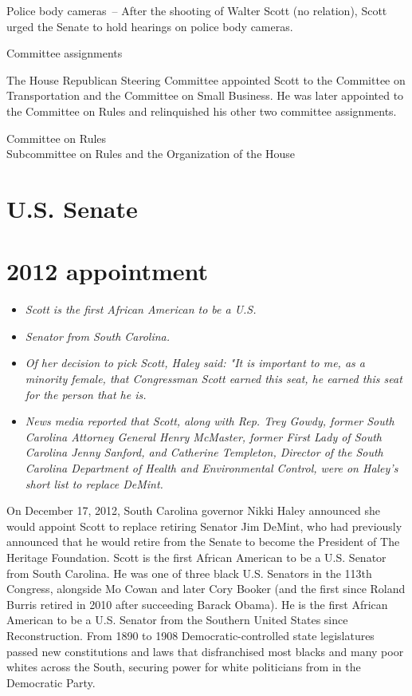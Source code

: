 Police body cameras~-- After the shooting of Walter Scott (no relation),
Scott urged the Senate to hold hearings on police body cameras.

Committee assignments

The House Republican Steering Committee appointed Scott to the Committee
on Transportation and the Committee on Small Business. He was later
appointed to the Committee on Rules and relinquished his other two
committee assignments.

Committee on Rules\\
Subcommittee on Rules and the Organization of the House

\section{U.S. Senate}\label{u.s.-senate}

\section{2012 appointment}\label{appointment}

\begin{itemize}
\item
  \emph{Scott is the first African American to be a U.S.}
\item
  \emph{Senator from South Carolina.}
\item
  \emph{Of her decision to pick Scott, Haley said: "It is important to
  me, as a minority female, that Congressman Scott earned this seat, he
  earned this seat for the person that he is.}
\item
  \emph{News media reported that Scott, along with Rep. Trey Gowdy,
  former South Carolina Attorney General Henry McMaster, former First
  Lady of South Carolina Jenny Sanford, and Catherine Templeton,
  Director of the South Carolina Department of Health and Environmental
  Control, were on Haley's short list to replace DeMint.}
\end{itemize}

On December 17, 2012, South Carolina governor Nikki Haley announced she
would appoint Scott to replace retiring Senator Jim DeMint, who had
previously announced that he would retire from the Senate to become the
President of The Heritage Foundation. Scott is the first African
American to be a U.S. Senator from South Carolina. He was one of three
black U.S. Senators in the 113th Congress, alongside Mo Cowan and later
Cory Booker (and the first since Roland Burris retired in 2010 after
succeeding Barack Obama). He is the first African American to be a U.S.
Senator from the Southern United States since Reconstruction. From 1890
to 1908 Democratic-controlled state legislatures passed new
constitutions and laws that disfranchised most blacks and many poor
whites across the South, securing power for white politicians from in
the Democratic Party.

